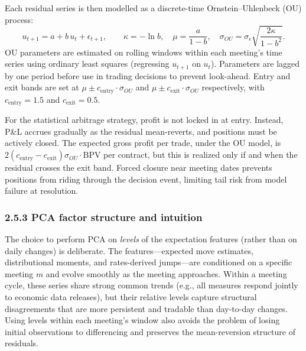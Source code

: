 Each residual series is then modelled as a discrete-time Ornstein--Uhlenbeck (OU) process:
\[
u_{t+1} = a + b\, u_t + \epsilon_{t+1}, \qquad \kappa = -\ln b, \quad \mu = \frac{a}{1-b}, \quad \sigma_{OU} = \sigma_\epsilon \sqrt{\frac{2\kappa}{1-b^2}}.
\]
OU parameters are estimated on rolling windows within each meeting's time series using ordinary least squares (regressing $u_{t+1}$ on $u_t$). Parameters are lagged by one period before use in trading decisions to prevent look-ahead. Entry and exit bands are set at $\mu \pm c_\text{entry} \cdot \sigma_{OU}$ and $\mu \pm c_\text{exit} \cdot \sigma_{OU}$ respectively, with $c_\text{entry} = 1.5$ and $c_\text{exit} = 0.5$.

For the statistical arbitrage strategy, profit is not locked in at entry. Instead, P\&L accrues gradually as the residual mean-reverts, and positions must be actively closed. The expected gross profit per trade, under the OU model, is $2(c_\text{entry} - c_\text{exit}) \sigma_{OU} \cdot \text{BPV}$ per contract, but this is realized only if and when the residual crosses the exit band. Forced closure near meeting dates prevents positions from riding through the decision event, limiting tail risk from model failure at resolution.

\subsubsection*{2.5.3 PCA factor structure and intuition}

The choice to perform PCA on \emph{levels} of the expectation features (rather than on daily changes) is deliberate. The features---expected move estimates, distributional moments, and rates-derived jumps---are conditioned on a specific meeting $m$ and evolve smoothly as the meeting approaches. Within a meeting cycle, these series share strong common trends (e.g., all measures respond jointly to economic data releases), but their relative levels capture structural disagreements that are more persistent and tradable than day-to-day changes. Using levels within each meeting's window also avoids the problem of losing initial observations to differencing and preserves the mean-reversion structure of residuals.

